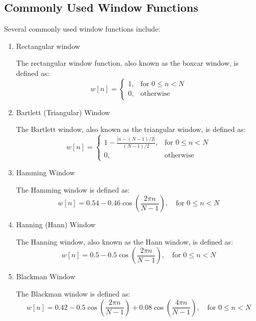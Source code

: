 \documentclass{article}
\begin{document}
\subsection{Commonly Used Window Functions}

Several commonly used window functions include:
\begin{enumerate}
 \item Rectangular window

The rectangular window function, also known as the boxcar window, is defined as:
\begin{equation}
w[n] = \begin{cases}
1, & \text{for } 0 \leq n < N \\
0, & \text{otherwise}
\end{cases}
\end{equation}

 \item Bartlett (Triangular) Window
 
The Bartlett window, also known as the triangular window, is defined as:
\begin{equation}
w[n] = \begin{cases}
1 - \frac{|n - (N - 1)/2|}{(N - 1)/2}, & \text{for } 0 \leq n < N \\
0, & \text{otherwise}
\end{cases}
\end{equation}

 \item Hamming Window
 
The Hamming window is defined as:
\begin{equation}
w[n] = 0.54 - 0.46 \cos\left(\frac{2\pi n}{N - 1}\right), \quad \text{for } 0 \leq n < N
\end{equation}

 \item Hanning (Hann) Window
 
The Hanning window, also known as the Hann window, is defined as:
\begin{equation}
w[n] = 0.5 - 0.5 \cos\left(\frac{2\pi n}{N - 1}\right), \quad \text{for } 0 \leq n < N
\end{equation}

 \item Blackman Window
 
The Blackman window is defined as:
\begin{equation}
w[n] = 0.42 - 0.5 \cos\left(\frac{2\pi n}{N - 1}\right) + 0.08 \cos\left(\frac{4\pi n}{N - 1}\right), \quad \text{for } 0 \leq n < N
\end{equation}
\end{enumerate}
\end{document}
